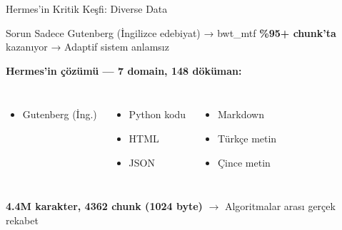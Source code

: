 \documentclass[10pt,aspectratio=43]{beamer}
\begin{document}
\begin{frame}{Hermes'in Kritik Keşfi: Diverse Data}
  \begin{block}{Sorun}
    Sadece Gutenberg (İngilizce edebiyat) → bwt\_mtf \textbf{\%95+ chunk'ta} kazanıyor → Adaptif sistem anlamsız
  \end{block}

  \vspace{0.3em}
  \textbf{Hermes'in çözümü — 7 domain, 148 döküman:}
  \vspace{0.3em}
  \begin{columns}
    \begin{itemize}
      \setlength{\itemsep}{0.2em}
      \item Gutenberg (İng.)
    \end{itemize}
    \begin{itemize}
      \setlength{\itemsep}{0.2em}
      \item Python kodu
      \item HTML
      \item JSON
    \end{itemize}
    \begin{itemize}
      \setlength{\itemsep}{0.2em}
      \item Markdown
      \item Türkçe metin
      \item Çince metin
    \end{itemize}
  \end{columns}

  \vspace{0.3em}
  \begin{center}
    \textbf{4.4M karakter, 4362 chunk (1024 byte)} $\rightarrow$ Algoritmalar arası \alert{gerçek rekabet}
  \end{center}
\end{frame}
\end{document}
